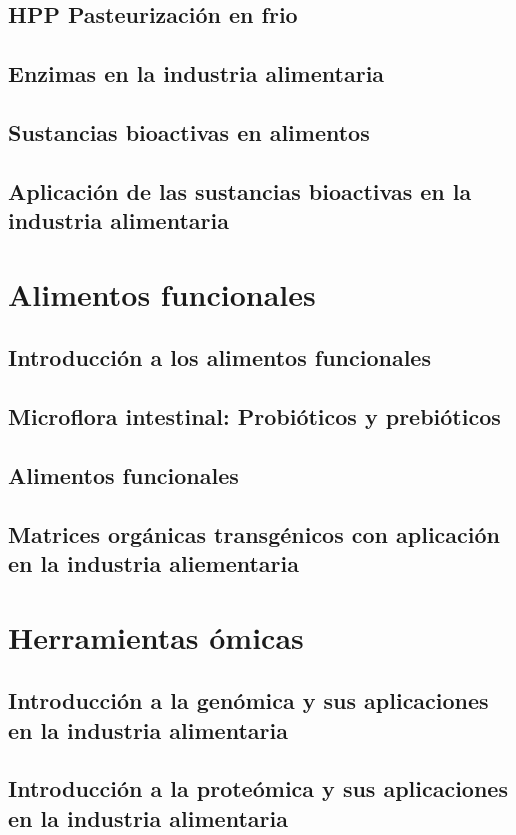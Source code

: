 \documentclass{AsignaturaResumen}
\begin{document}
    \chapter{HPP Pasteurización en frio}
    \chapter{Enzimas en la industria alimentaria}
    \chapter{Sustancias bioactivas en alimentos}
    \chapter{Aplicación de las sustancias bioactivas en la industria alimentaria}

\part{Alimentos funcionales}

    \chapter{Introducción a los alimentos funcionales}
    \chapter{Microflora intestinal: Probióticos y prebióticos}
    \chapter{Alimentos funcionales}
    \chapter{Matrices orgánicas transgénicos con aplicación en la industria aliementaria}

\part{Herramientas ómicas}

    \chapter{Introducción a la genómica y sus aplicaciones en la industria alimentaria}
    \chapter{Introducción a la proteómica y sus aplicaciones en la industria alimentaria}
\end{document}
